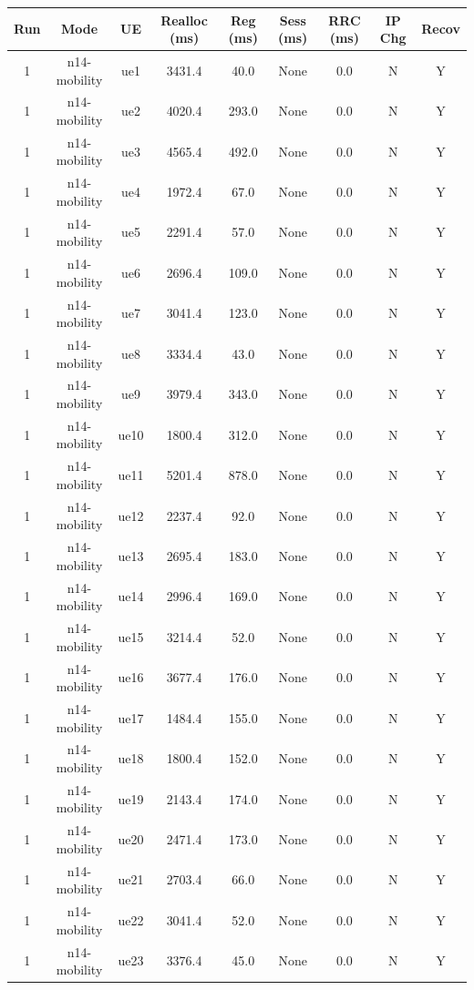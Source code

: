 \begin{table}[ht]
\centering
\begin{tabular}{|c|c|c|c|c|c|c|c|c|}
\hline
Run & Mode & UE & Realloc (ms) & Reg (ms) & Sess (ms) & RRC (ms) & IP Chg & Recov \\
\hline
1 & n14-mobility & ue1 & 3431.4 & 40.0 & None & 0.0 & N & Y \\
1 & n14-mobility & ue2 & 4020.4 & 293.0 & None & 0.0 & N & Y \\
1 & n14-mobility & ue3 & 4565.4 & 492.0 & None & 0.0 & N & Y \\
1 & n14-mobility & ue4 & 1972.4 & 67.0 & None & 0.0 & N & Y \\
1 & n14-mobility & ue5 & 2291.4 & 57.0 & None & 0.0 & N & Y \\
1 & n14-mobility & ue6 & 2696.4 & 109.0 & None & 0.0 & N & Y \\
1 & n14-mobility & ue7 & 3041.4 & 123.0 & None & 0.0 & N & Y \\
1 & n14-mobility & ue8 & 3334.4 & 43.0 & None & 0.0 & N & Y \\
1 & n14-mobility & ue9 & 3979.4 & 343.0 & None & 0.0 & N & Y \\
1 & n14-mobility & ue10 & 1800.4 & 312.0 & None & 0.0 & N & Y \\
1 & n14-mobility & ue11 & 5201.4 & 878.0 & None & 0.0 & N & Y \\
1 & n14-mobility & ue12 & 2237.4 & 92.0 & None & 0.0 & N & Y \\
1 & n14-mobility & ue13 & 2695.4 & 183.0 & None & 0.0 & N & Y \\
1 & n14-mobility & ue14 & 2996.4 & 169.0 & None & 0.0 & N & Y \\
1 & n14-mobility & ue15 & 3214.4 & 52.0 & None & 0.0 & N & Y \\
1 & n14-mobility & ue16 & 3677.4 & 176.0 & None & 0.0 & N & Y \\
1 & n14-mobility & ue17 & 1484.4 & 155.0 & None & 0.0 & N & Y \\
1 & n14-mobility & ue18 & 1800.4 & 152.0 & None & 0.0 & N & Y \\
1 & n14-mobility & ue19 & 2143.4 & 174.0 & None & 0.0 & N & Y \\
1 & n14-mobility & ue20 & 2471.4 & 173.0 & None & 0.0 & N & Y \\
1 & n14-mobility & ue21 & 2703.4 & 66.0 & None & 0.0 & N & Y \\
1 & n14-mobility & ue22 & 3041.4 & 52.0 & None & 0.0 & N & Y \\
1 & n14-mobility & ue23 & 3376.4 & 45.0 & None & 0.0 & N & Y \\

\end{tabular}
\end{table}
